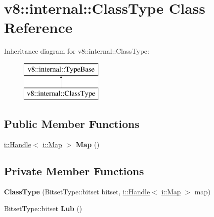 \hypertarget{classv8_1_1internal_1_1_class_type}{}\section{v8\+:\+:internal\+:\+:Class\+Type Class Reference}
\label{classv8_1_1internal_1_1_class_type}
Inheritance diagram for v8\+:\+:internal\+:\+:Class\+Type\+:\begin{figure}[H]
\begin{center}
\leavevmode
\includegraphics[height=2.000000cm]{classv8_1_1internal_1_1_class_type}
\end{center}
\end{figure}
\subsection*{Public Member Functions}
\begin{DoxyCompactItemize}
\item 
\hyperlink{classv8_1_1internal_1_1_handle}{i\+::\+Handle}$<$ \hyperlink{classv8_1_1internal_1_1_map}{i\+::\+Map} $>$ {\bfseries Map} ()\hypertarget{classv8_1_1internal_1_1_class_type_a139eba30ec8fc17a54449601b4bea183}{}\label{classv8_1_1internal_1_1_class_type_a139eba30ec8fc17a54449601b4bea183}

\end{DoxyCompactItemize}
\subsection*{Private Member Functions}
\begin{DoxyCompactItemize}
\item 
{\bfseries Class\+Type} (Bitset\+Type\+::bitset bitset, \hyperlink{classv8_1_1internal_1_1_handle}{i\+::\+Handle}$<$ \hyperlink{classv8_1_1internal_1_1_map}{i\+::\+Map} $>$ map)\hypertarget{classv8_1_1internal_1_1_class_type_a1bd70679b9a25182190e649c94662a00}{}\label{classv8_1_1internal_1_1_class_type_a1bd70679b9a25182190e649c94662a00}

\item 
Bitset\+Type\+::bitset {\bfseries Lub} ()\hypertarget{classv8_1_1internal_1_1_class_type_a03314756ddccb5a372038a6afc9f2d1b}{}\label{classv8_1_1internal_1_1_class_type_a03314756ddccb5a372038a6afc9f2d1b}

\end{DoxyCompactItemize}
